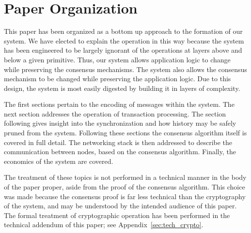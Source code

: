 \section{Paper Organization}

This paper has been organized as a bottom up approach to the formation
of our system.
We have elected to explain the operation in this way because the system
has been engineered to be largely ignorant of the operations at layers
above and below a given primitive.
Thus, our system allows application logic to change while preserving
the consensus mechanisms.
The system also allows the consensus mechanism to be changed while
preserving the application logic.
Due to this design, the system is most easily digested by building it
in layers of complexity.

The first sections pertain to the encoding of messages within the
system.
The next section addresses the operation of transaction processing.
The section following gives insight into the synchronization and how
history may be safely pruned from the system.
Following these sections the consensus algorithm itself is covered in
full detail.
The networking stack is then addressed to describe the communication
between nodes, based on the consensus algorithm.
Finally, the economics of the system are covered.

The treatment of these topics is not performed in a technical manner in
the body of the paper proper, aside from the proof of the consensus
algorithm.
This choice was made because the consensus proof is far less technical
than the cryptography of the system, and may be understood by the
intended audience of this paper.
The formal treatment of cryptographic operation has been performed in
the technical addendum of this paper; see Appendix~\ref{sec:tech_crypto}.
